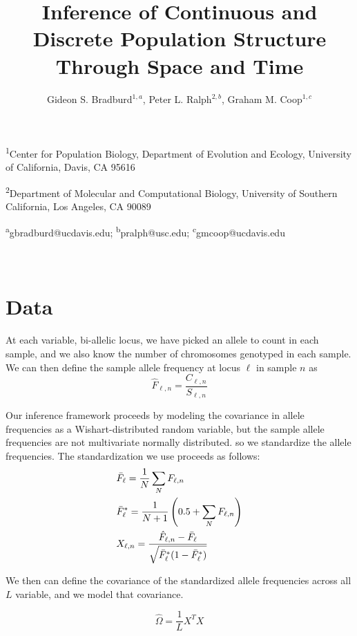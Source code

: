 \documentclass[12pt]{article}
\title{Inference of Continuous and Discrete Population Structure Through Space and Time}
\date{\vspace{-5ex}}
\author{Gideon S. Bradburd$^{1,a}$, Peter L. Ralph$^{2,b}$, Graham M. Coop$^{1,c}$}
\begin{document}
\maketitle

\textsuperscript{1}Center for Population Biology, Department of Evolution and Ecology, University of California, Davis, CA 95616

\textsuperscript{2}Department of Molecular and Computational Biology, University of Southern California, Los Angeles, CA 90089

\textsuperscript{a}gbradburd@ucdavis.edu; 
\textsuperscript{b}pralph@usc.edu;
\textsuperscript{c}gmcoop@ucdavis.edu\\\\\

\newpage

\section{Data}
At each variable, bi-allelic locus, we have picked an allele to count in each sample, and we also know the number of chromosomes genotyped in each sample.  We can then define the sample allele frequency at locus $\ell$ in sample $n$ as 
\begin{equation}
\hat{F}_{\ell,n} = \frac{C_{\ell,n}}{S_{\ell,n}}
\label{sample_freqs}
\end{equation}

Our inference framework proceeds by modeling the covariance in allele frequencies 
as a Wishart-distributed random variable, 
but the sample allele frequencies are not multivariate normally distributed.
so we standardize the allele frequencies.
The standardization we use proceeds as follows:
\begin{align}
&\bar{F}_{\ell} = \frac{1}{N}\sum\limits_NF_{\ell,n} \\ \notag
&\bar{F}^{*}_{\ell} = \frac{1}{N+1}\left( 0.5 + \sum\limits_N	F_{\ell,n} \right)   \\ \notag
&X_{\ell,n} = \frac{\hat{F}_{\ell,n} - \bar{F}_{\ell}}{\sqrt{\bar{F}^{*}_{\ell} (1-\bar{F}^{*}_{\ell})}}
\label{sample_freqs}
\end{align}

We then can define the covariance of the standardized allele frequencies 
across all $L$ variable, and we model that covariance.

\begin{equation}
\widehat{\Omega} = \frac{1}{L} X^TX
\label{sample_std_cov}
\end{equation}
\end{document}
